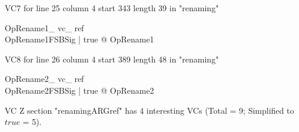\documentclass{article}
\begin{document}
VC7 for line 25 column 4 start 343 length 39 in "renaming"
\begin{theorem}{ OpRename1\_ vc\_ ref}\\
 \forall OpRename1FSBSig | true @ \pre OpRename1 \\

\end{theorem}

VC8 for line 26 column 4 start 389 length 48 in "renaming"
\begin{theorem}{ OpRename2\_ vc\_ ref}\\
 \forall OpRename2FSBSig | true @ \pre OpRename2 \\

\end{theorem}



 VC Z section "renamingARGref" has $4$ interesting VCs (Total = 9; Simplified to $true$ = 5).



\end{document}
